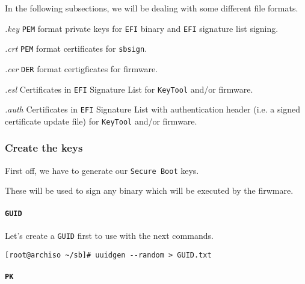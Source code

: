 \documentclass[10pt]{dustdoc}
\begin{document}
In the following subsections, we will be dealing with some different file formats.

\begin{sidebar}{\textit{.key}}
    \texttt{PEM} format private keys for \texttt{EFI} binary and \texttt{EFI} signature list signing.
\end{sidebar}

\begin{sidebar}{\textit{.crt}}
    \texttt{PEM} format certificates for \texttt{sbsign}.
\end{sidebar}

\begin{sidebar}{\textit{.cer}}
    \texttt{DER} format certigficates for firmware.
\end{sidebar}

\begin{sidebar}{\textit{.esl}}
    Certificates in \texttt{EFI} Signature List for \texttt{KeyTool} and/or firmware.
\end{sidebar}

\begin{sidebar}{\textit{.auth}}
    Certificates in \texttt{EFI} Signature List with authentication header (i.e. a signed certificate update file) for \texttt{KeyTool} and/or firmware.
\end{sidebar}

\subsubsection{Create the keys}
\label{sec:create-the-keys}

First off, we have to generate our \texttt{Secure Boot} keys.

These will be used to sign any binary which will be executed by the firwmare.

\paragraph{\texttt{GUID}}
\label{par:guid}

Let’s create a \texttt{GUID} first to use with the next commands.

\begin{verbatim}
[root@archiso ~/sb]# uuidgen --random > GUID.txt
\end{verbatim}

\paragraph{\texttt{PK}}
\label{par:pk}
\end{document}
